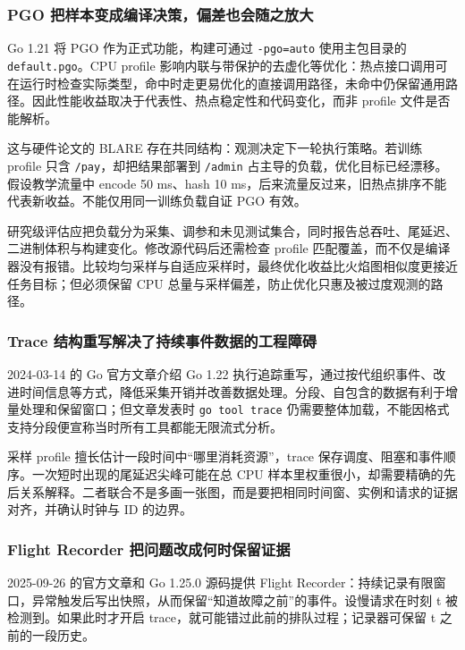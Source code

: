 \documentclass[UTF8,fontset=fandol,openany,11pt]{ctexbook}
\begin{document}
\subsubsection{PGO 把样本变成编译决策，偏差也会随之放大}
Go 1.21 将 PGO 作为正式功能，构建可通过 \texttt{-\allowbreak{}pgo=auto} 使用主包目录的 \texttt{default.\allowbreak{}pgo}。CPU profile 影响内联与带保护的去虚化等优化：热点接口调用可在运行时检查实际类型，命中时走更易优化的直接调用路径，未命中仍保留通用路径。因此性能收益取决于代表性、热点稳定性和代码变化，而非 profile 文件是否能解析。\cite{front-go121}

这与硬件论文的 BLARE 存在共同结构：观测决定下一轮执行策略。若训练 profile 只含 \texttt{/\allowbreak{}pay}，却把结果部署到 \texttt{/\allowbreak{}admin} 占主导的负载，优化目标已经漂移。假设教学流量中 encode 50 ms、hash 10 ms，后来流量反过来，旧热点排序不能代表新收益。不能仅用同一训练负载自证 PGO 有效。

研究级评估应把负载分为采集、调参和未见测试集合，同时报告总吞吐、尾延迟、二进制体积与构建变化。修改源代码后还需检查 profile 匹配覆盖，而不仅是编译器没有报错。比较均匀采样与自适应采样时，最终优化收益比火焰图相似度更接近任务目标；但必须保留 CPU 总量与采样偏差，防止优化只惠及被过度观测的路径。

\subsubsection{Trace 结构重写解决了持续事件数据的工程障碍}
2024-03-14 的 Go 官方文章介绍 Go 1.22 执行追踪重写，通过按代组织事件、改进时间信息等方式，降低采集开销并改善数据处理。分段、自包含的数据有利于增量处理和保留窗口；但文章发表时 \texttt{go tool trace} 仍需要整体加载，不能因格式支持分段便宣称当时所有工具都能无限流式分析。\cite{front-trace2024}

采样 profile 擅长估计一段时间中“哪里消耗资源”，trace 保存调度、阻塞和事件顺序。一次短时出现的尾延迟尖峰可能在总 CPU 样本里权重很小，却需要精确的先后关系解释。二者联合不是多画一张图，而是要把相同时间窗、实例和请求的证据对齐，并确认时钟与 ID 的边界。

\subsubsection{Flight Recorder 把问题改成何时保留证据}
2025-09-26 的官方文章和 Go 1.25.0 源码提供 Flight Recorder：持续记录有限窗口，异常触发后写出快照，从而保留“知道故障之前”的事件。设慢请求在时刻 t 被检测到。如果此时才开启 trace，就可能错过此前的排队过程；记录器可保留 t 之前的一段历史。\cite{front-flight2025} \cite{front-flight-source}
\end{document}

